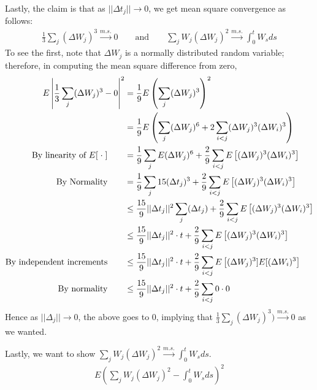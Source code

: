 \documentclass[12pt]{article}
\theoremstyle{plain}
\theoremstyle{definition}
\theoremstyle{remark}
\begin{document}
\begin{enumerate}
\begin{enumerate}
      Lastly, the claim is that as $||\Delta t_j||\rightarrow 0$, we get
      mean square convergence as follows:
      \begin{align*}
        \frac{1}{3}\sum_j (\Delta W_j)^3 \xrightarrow{m.s.} 0
        \qquad\text{and}\qquad
        \sum_j W_j (\Delta W_j)^2 \xrightarrow{m.s.} \int^t_0 W_s ds
      \end{align*}
      To see the first, note that $\Delta W_j$ is a normally distributed
      random variable; therefore, in computing the mean square
      difference from zero,
      \begin{align*}
        E\left\lvert \frac{1}{3} \sum_j (\Delta W_j)^3 - 0\right\rvert^2
        &=\frac{1}{9} E\left( \sum_j (\Delta W_j)^3\right)^2\notag\\
        &=\frac{1}{9} E\left( \sum_j (\Delta W_j)^6
          + 2\sum_{i<j}(\Delta W_j)^3 (\Delta W_i)^3\right)\\
        \text{By linearity of $E[\;\cdot\;]$} \qquad
        &=\frac{1}{9} \sum_j E(\Delta W_j)^6
        + \frac{2}{9}\sum_{i<j} E\left[(\Delta W_j)^3 (\Delta W_i)^3\right]\\
        \text{By Normality} \qquad
        &= \frac{1}{9} \sum_j 15( \Delta t_j)^3
          + \frac{2}{9}\sum_{i<j} E\left[(\Delta W_j)^3 (\Delta W_i)^3\right]\\
        &\leq \frac{15}{9} ||\Delta t_j||^2 \sum_j (\Delta t_j)
          + \frac{2}{9}\sum_{i<j} E\left[(\Delta W_j)^3 (\Delta W_i)^3\right]\\
        &\leq \frac{15}{9} ||\Delta t_j||^2 \cdot t
          + \frac{2}{9}\sum_{i<j} E\left[(\Delta W_j)^3 (\Delta W_i)^3\right]\\
        \text{By independent increments} \qquad
        &\leq \frac{15}{9} ||\Delta t_j||^2 \cdot t
        + \frac{2}{9}\sum_{i<j} E\left[(\Delta W_j)^3] E[(\Delta W_i)^3\right]\\
        \text{By normality} \qquad
        &\leq \frac{15}{9} ||\Delta t_j||^2 \cdot t
        + \frac{2}{9}\sum_{i<j} 0 \cdot 0
      \end{align*}
      Hence as $||\Delta_j||\rightarrow 0$, the above goes to 0,
      implying that $\frac{1}{3}\sum_j (\Delta W_j)^3)
      \xrightarrow{m.s.} 0$ as we wanted.

      Lastly, we want to show $\sum_j W_j (\Delta W_j)^2
      \xrightarrow{m.s.} \int^t_0 W_s ds$.
      \begin{align*}
        E\left( \sum_j W_j (\Delta W_j)^2 - \int^t_0 W_s ds\right)^2
      \end{align*}


\end{enumerate}
\end{enumerate}
\end{document}
